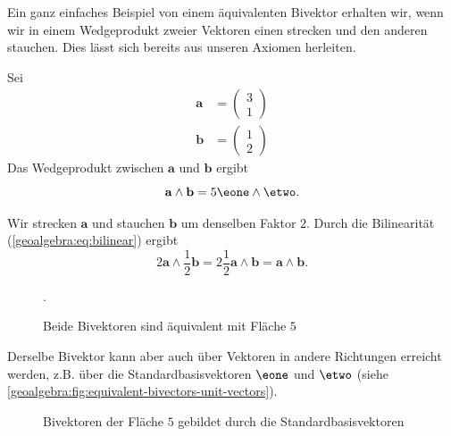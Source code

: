 Ein ganz einfaches Beispiel von einem äquivalenten Bivektor erhalten wir, wenn wir in einem Wedgeprodukt zweier Vektoren einen strecken
und den anderen stauchen. Dies lässt sich bereits aus unseren Axiomen herleiten.

{
\renewcommand{\a}{\mathbf{a}}
\renewcommand{\b}{\mathbf{b}}
\begin{beispiel}
Sei
  \begin{align*}
    \a &= \begin{pmatrix} 3 \\ 1 \end{pmatrix} \\
    \b &= \begin{pmatrix} 1 \\ 2 \end{pmatrix}
  \end{align*}
Das Wedgeprodukt zwischen $\a$ und $\b$ ergibt
  \begin{equation}
    \a \wedge \b = 5 \eone \wedge \etwo.
  \end{equation}

  Wir strecken $\a$ und stauchen $\b$ um denselben Faktor $2$. Durch die Bilinearität (\eqref{geoalgebra:eq:bilinear}) ergibt
  \begin{equation}
    2 \a \wedge \frac{1}{2} \b = 2 \frac{1}{2} \a \wedge \b = \a \wedge \b.
  \end{equation}



\begin{figure}
  \begin{center}


  \end{center}
  \caption{Beide Bivektoren sind äquivalent mit Fläche $5$}\label{geoalgebra:fig:bivektor-als-flaeche}.
\end{figure}
\end{beispiel}

Derselbe Bivektor kann aber auch über Vektoren in andere Richtungen erreicht werden, z.B. über die Standardbasisvektoren $\eone$ und $\etwo$ (siehe \autoref{geoalgebra:fig:equivalent-bivectors-unit-vectors}).

\begin{figure}
\begin{center}


  \caption{Bivektoren der Fläche $5$ gebildet durch die Standardbasisvektoren}
  \label{geoalgebra:fig:equivalent-bivectors-unit-vectors}
\end{center}
\end{figure}

}


